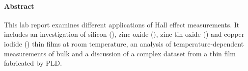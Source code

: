 \paragraph{Abstract}
This lab report examines different applications of Hall effect 
measurements. 
It includes an investigation of silicon (), zinc oxide (),
zinc tin oxide () and copper iodide () thin films at room temperature, 
an analysis of temperature-dependent measurements of bulk  and a 
discussion of a complex dataset from a  thin film fabricated 
by PLD.
